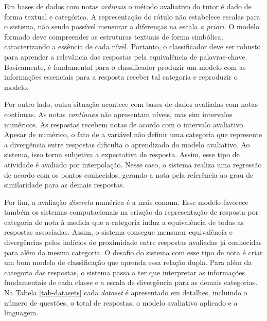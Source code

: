Em bases de dados com notas \textit{ordinais} o método avaliativo do tutor é dado de forma textual e categórica. A representação do rótulo não estabelece escalas para o sistema, não sendo possível mensurar a diferenças na escala \textit{a priori}. O modelo formado deve compreender as estruturas textuais de forma simbólica, caracterizando a essência de cada nível. Portanto, o classificador deve ser robusto para aprender a relevância das respostas pela equivalência de palavras-chave. Basicamente, é fundamental para o classificador produzir um modelo com as informações essenciais para a resposta receber tal categoria e reproduzir o modelo.

Por outro lado, outra situação acontece com bases de dados avaliadas com notas contínuas. As notas \textit{contínuas} não apresentam níveis, mas sim intervalos numéricos. As respostas recebem notas de acordo com o intervalo avaliativo. Apesar de numérico, o fato de a variável não definir uma categoria que represente a divergência entre respostas dificulta o aprendizado do modelo avaliativo. Ao sistema, isso torna subjetiva a expectativa de resposta. Assim, esse tipo de atividade é avaliado por interpolação. Nesse caso, o sistema realiza uma regressão de acordo com os pontos conhecidos, gerando a nota pela referência ao grau de similaridade para as demais respostas.

Por fim, a avaliação \textit{discreta} numérica é a mais comum. Esse modelo favorece também os sistemas computacionais na criação da representação de resposta por categoria de nota à medida que a categoria induz a equivalência de todas as respostas associadas. Assim, o sistema consegue mensurar equivalência e divergências pelos indícios de proximidade entre respostas avaliadas já conhecidas para além da mesma categoria. O desafio do sistema com esse tipo de nota é criar um bom modelo de classificação que aprenda essa relação dupla. Para além da categoria das respostas, o sistema passa a ter que interpretar as informações fundamentais de cada classe e a escala de divergência para as demais categorias. Na Tabela \ref{tab-datasets} cada \textit{dataset} é apresentado em detalhes, incluindo o número de questões, o total de respostas, o modelo avaliativo aplicado e a linguagem.

